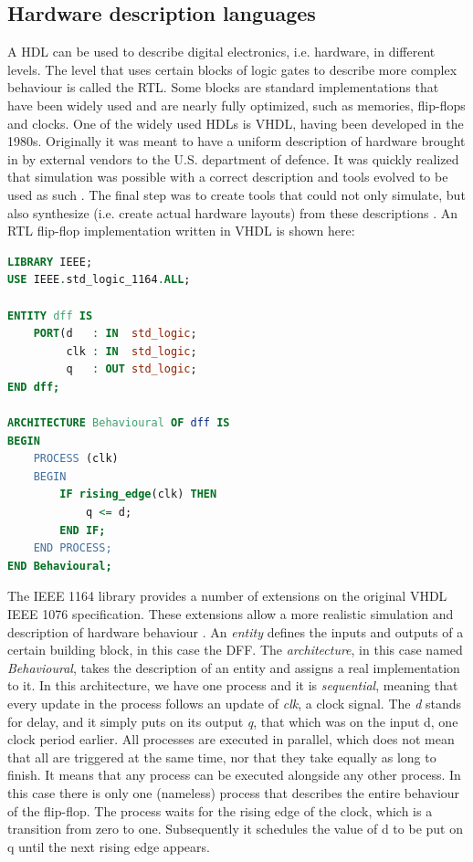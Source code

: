 \documentclass[11pt,british]{article}
\begin{document}
\subsection{Hardware description languages}
\label{subsec:HDL}
A \gls{HDL} can be used to describe digital electronics, i.e. hardware, in different levels. The level that uses certain blocks of logic gates to describe more complex behaviour is called the \gls{RTL}. Some blocks are standard implementations that have been widely used and are nearly fully optimized, such as memories, flip-flops and clocks. One of the widely used HDLs is \gls{VHDL}, having been developed in the 1980s. Originally it was meant to have a uniform description of hardware brought in by external vendors to the U.S. department of defence. It was quickly realized that simulation was possible with a correct description and tools evolved to be used as such \cite{vhdlorigin,vhdlorigin2}. The final step was to create tools that could not only simulate, but also synthesize (i.e. create actual hardware layouts) from these descriptions \cite{vhdlsim, vhdlsynth, vhdlsynth2, vhdlsynth3}. An \gls{RTL} flip-flop implementation written in \gls{VHDL} is shown here: 
\begin{lstlisting}[language=VHDL, tabsize=4, frame=single, framesep=2mm, belowskip=16pt, aboveskip=16pt, showstringspaces=false, basicstyle=\footnotesize]
LIBRARY IEEE;
USE IEEE.std_logic_1164.ALL;

ENTITY dff IS
	PORT(d 	 : IN  std_logic;
		 clk : IN  std_logic;
		 q 	 : OUT std_logic;
END dff;

ARCHITECTURE Behavioural OF dff IS
BEGIN
	PROCESS (clk)
	BEGIN
		IF rising_edge(clk) THEN
			q <= d;
		END IF;
	END PROCESS;
END Behavioural;
\end{lstlisting}
The \gls{IEEE} 1164 library provides a number of extensions on the original \gls{VHDL} IEEE 1076 specification. These extensions allow a more realistic simulation and description of hardware behaviour \cite{IEEE1164}. An \emph{entity} defines the inputs and outputs of a certain building block, in this case the \gls{DFF}. The \emph{architecture}, in this case named \emph{Behavioural}, takes the description of an entity and assigns a real implementation to it. In this architecture, we have one process and it is \emph{sequential}, meaning that every update in the process follows an update of \emph{clk}, a clock signal. The \emph{d} stands for delay, and it simply puts on its output \emph{q}, that which was on the input d, one clock period earlier. All processes are executed in parallel, which does not mean that all are triggered at the same time, nor that they take equally as long to finish. It means that any process can be executed alongside any other process. In this case there is only one (nameless) process that describes the entire behaviour of the flip-flop. The process waits for the rising edge of the clock, which is a transition from zero to one. Subsequently it schedules the value of d to be put on q until the next rising edge appears.
\end{document}
